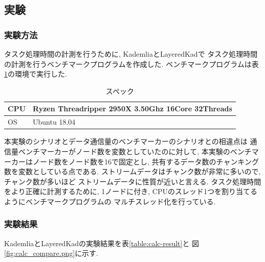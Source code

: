 \documentclass[sotsuron]{jcsie}
\begin{document}
\subsection{実験}
\subsubsection{実験方法}
タスク処理時間の計測を行うために, KademliaとLayeredKadで
タスク処理時間の計測を行うベンチマークプログラムを作成した.
ベンチマークプログラムは表\ref{table:spec-ryzen}の環境で実行した.

\begin{table}[H]
	\caption{スペック}	
	\centering
	\label{table:spec-ryzen}
	\begin{tabular}{|l|l|}
		\hline
		CPU &   
		Ryzen Threadripper 2950X 3.50Ghz 16Core 32Threads \\ 
		\hline	
		OS  &   
		Ubuntu 18.04 \\ 
		\hline
	\end{tabular}	
\end{table}

本実験のシナリオとデータ通信量のベンチマーカーのシナリオとの相違点は
通信量ベンチマーカーがノード数を変数としていたのに対して, 
本実験のベンチマーカーはノード数をノード数を16で固定とし, 
共有するデータ数のチャンキング数を変数としている点である.
ストリームデータはチャンク数が非常に多いので, チャンク数が多いほど
ストリームデータに性質が近いと言える.
タスク処理時間をより正確に計測するために, 
1ノードに付き, CPUのスレッド1つを割り当てるようにベンチマークプログラムの
マルチスレッド化を行っている.

\subsubsection{実験結果}
KademliaとLayeredKadの実験結果を表\ref{table:calc-result}と
図\ref{fig:calc_compare.png}に示す.
\end{document}
